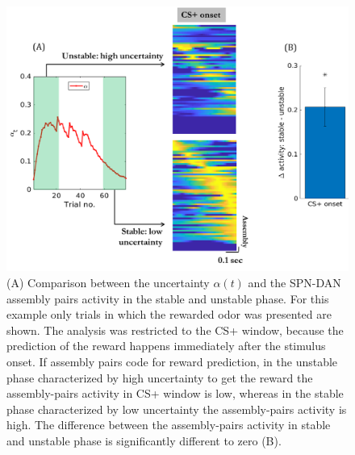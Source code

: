\begin{figure}
    \centering
    \includegraphics[scale=0.54]{figures/PreRegress.png}
    \caption{(A) Comparison between the uncertainty $\alpha(t)$ and the SPN-DAN assembly pairs activity in the stable and unstable phase. For this example only trials in which the rewarded odor was presented are shown. The analysis was restricted to the CS+ window, because the prediction of the reward happens immediately after the stimulus onset. If assembly pairs code for reward prediction, in the unstable phase characterized by high uncertainty to get the reward the assembly-pairs activity in CS+ window is low, whereas in the stable phase characterized by low uncertainty the assembly-pairs activity is high. The difference between the assembly-pairs activity in stable and unstable phase is significantly different to zero (B).}
    \label{fig:StableUnstableAlphaCS}
\end{figure}
